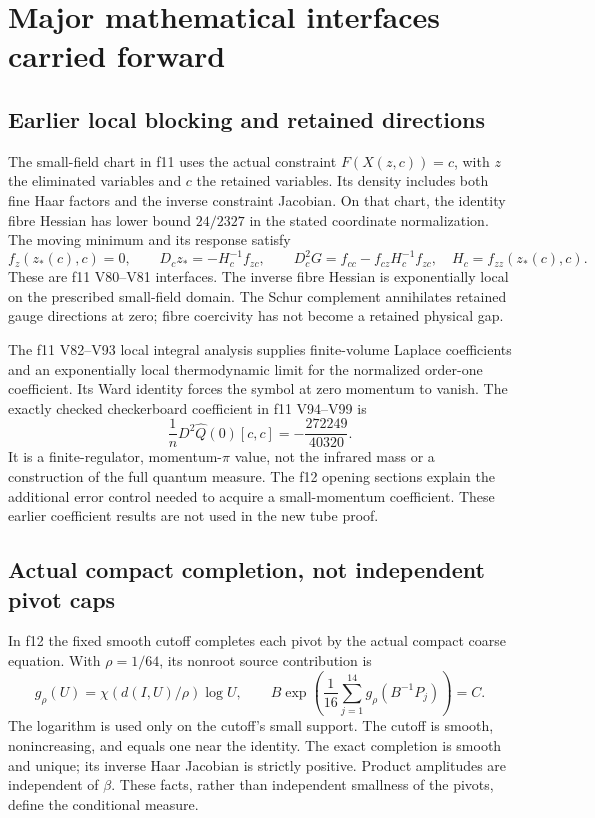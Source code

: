 \documentclass[11pt,oneside]{article}
\begin{document}
\section{Major mathematical interfaces carried forward}

\subsection{Earlier local blocking and retained directions}

The small-field chart in f11 uses the actual constraint
\(F(X(z,c))=c\), with \(z\) the eliminated variables and
\(c\) the retained variables. Its density includes both
fine Haar factors and the inverse constraint Jacobian.
On that chart, the identity fibre Hessian has lower
bound \(24/2327\) in the stated coordinate normalization.
The moving minimum and its response satisfy
\[
 f_z(z_*(c),c)=0,\qquad
 D_c z_*=-H_c^{-1}f_{zc},\qquad
 D_c^2G=f_{cc}-f_{cz}H_c^{-1}f_{zc},
 \quad H_c=f_{zz}(z_*(c),c).
\]
These are f11 V80--V81 interfaces. The inverse fibre
Hessian is exponentially local on the prescribed
small-field domain. The Schur complement annihilates
retained gauge directions at zero; fibre coercivity
has not become a retained physical gap.

The f11 V82--V93 local integral analysis supplies
finite-volume Laplace coefficients and an exponentially
local thermodynamic limit for the normalized order-one
coefficient. Its Ward identity forces the symbol at
zero momentum to vanish. The exactly checked
checkerboard coefficient in f11 V94--V99 is
\[
 \frac1n D^2\widehat Q(0)[c,c]=-\frac{272249}{40320}.
\]
It is a finite-regulator, momentum-\(\pi\) value, not
the infrared mass or a construction of the full
quantum measure. The f12 opening sections explain the
additional error control needed to acquire a
small-momentum coefficient. These earlier coefficient
results are not used in the new tube proof.

\subsection{Actual compact completion, not independent pivot caps}

In f12 the fixed smooth cutoff completes each pivot
by the actual compact coarse equation. With
\(\rho=1/64\), its nonroot source contribution is
\[
 g_\rho(U)=\chi(d(I,U)/\rho)\log U,\qquad
 B\exp\!\left(\frac1{16}\sum_{j=1}^{14}
                      g_\rho(B^{-1}P_j)\right)=C.
 \tag{2.1}
\]
The logarithm is used only on the cutoff's small
support. The cutoff is smooth, nonincreasing, and
equals one near the identity. The exact completion
is smooth and unique; its inverse Haar Jacobian is
strictly positive. Product amplitudes are independent
of \(\beta\). These facts, rather than independent
smallness of the pivots, define the conditional measure.
\end{document}
